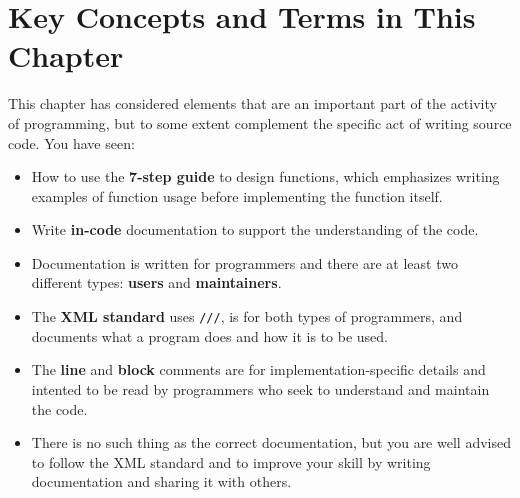 \documentclass[fsharpNotes.tex]{subfiles}
\begin{document}
\section{Key Concepts and Terms in This Chapter}
This chapter has considered elements that are an important part of the activity of programming, but to some extent complement the specific act of writing source code. You have seen:
\begin{itemize}
\item How to use the \textbf{7-step guide} to design functions, which emphasizes writing examples of function usage before implementing the function itself.
\item Write \textbf{in-code} documentation to support the understanding of the code. 
\item Documentation is written for programmers and there are at least two different types: \textbf{users} and \textbf{maintainers}. 
\item The \textbf{XML standard} uses \lstinline{///}, is for both types of programmers, and documents what a program does and how it is to be used.
\item The \textbf{line} and \textbf{block} comments are for implementation-specific details and intented to be read by programmers who seek to understand and maintain the code. 
\item There is no such thing as the correct documentation, but you are well advised to follow the XML standard and to improve your skill by writing documentation and sharing it with others.
\end{itemize}
\end{document}
